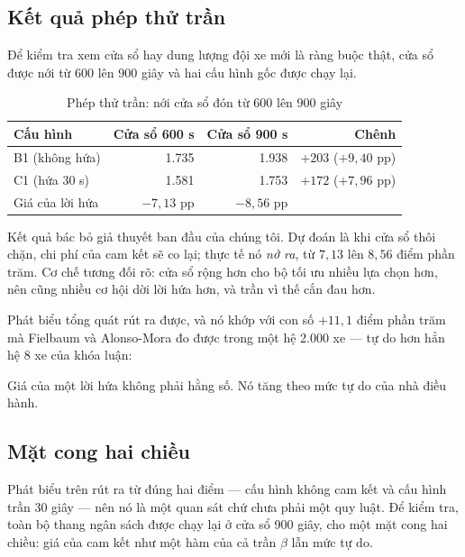 \subsection{Kết quả phép thử trần}

Để kiểm tra xem cửa sổ hay dung lượng đội xe mới là ràng buộc thật, cửa sổ được nới từ 600 lên
900 giây và hai cấu hình gốc được chạy lại.

\begin{table}[htbp]
\centering
\caption{Phép thử trần: nới cửa sổ đón từ 600 lên 900 giây}
\label{bang:tran}
\small
\begin{tabular}{@{}lrrr@{}}
\toprule
\textbf{Cấu hình} & \textbf{Cửa sổ 600 s} & \textbf{Cửa sổ 900 s} & \textbf{Chênh}\\
\midrule
B1 (không hứa) & 1.735 & 1.938 & $+203$ ($+9{,}40$ pp)\\
C1 (hứa 30 s) & 1.581 & 1.753 & $+172$ ($+7{,}96$ pp)\\
\midrule
Giá của lời hứa & $-7{,}13$ pp & $-8{,}56$ pp & \\
\bottomrule
\end{tabular}
\end{table}

Kết quả bác bỏ giả thuyết ban đầu của chúng tôi. Dự đoán là khi cửa sổ thôi chặn, chi phí của
cam kết sẽ co lại; thực tế nó \emph{nở ra}, từ $7{,}13$ lên $8{,}56$ điểm phần trăm. Cơ chế
tương đối rõ: cửa sổ rộng hơn cho bộ tối ưu nhiều lựa chọn hơn, nên cũng nhiều cơ hội dời lời
hứa hơn, và trần vì thế cắn đau hơn.

Phát biểu tổng quát rút ra được, và nó khớp với con số $+11{,}1$ điểm phần trăm mà Fielbaum và
Alonso-Mora đo được trong một hệ 2.000 xe --- tự do hơn hẳn hệ 8 xe của khóa luận:

\begin{khungy}
Giá của một lời hứa không phải hằng số. Nó tăng theo mức tự do của nhà điều hành.
\end{khungy}

\subsection{Mặt cong hai chiều}
\label{muc:matcong}

Phát biểu trên rút ra từ đúng hai điểm --- cấu hình không cam kết và cấu hình trần 30 giây ---
nên nó là một quan sát chứ chưa phải một quy luật. Để kiểm tra, toàn bộ thang ngân sách được
chạy lại ở cửa sổ 900 giây, cho một mặt cong hai chiều: giá của cam kết như một hàm của cả trần
$\beta$ lẫn mức tự do.

